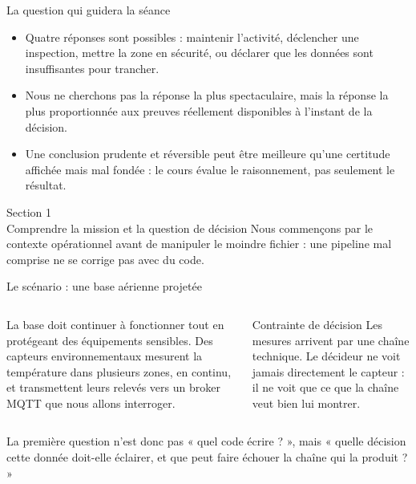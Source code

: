 \documentclass[aspectratio=169]{beamer}
\begin{document}
\begin{frame}{La question qui guidera la séance}
  \begin{itemize}
    \item Quatre réponses sont possibles : maintenir l'activité, déclencher une inspection, mettre la zone en sécurité, ou déclarer que les données sont insuffisantes pour trancher.
    \item Nous ne cherchons pas la réponse la plus spectaculaire, mais la réponse la plus proportionnée aux preuves réellement disponibles à l'instant de la décision.
    \item Une conclusion prudente et réversible peut être meilleure qu'une certitude affichée mais mal fondée : le cours évalue le raisonnement, pas seulement le résultat.
  \end{itemize}
\end{frame}

\begin{frame}[plain]
  \centering
  \Huge Section 1\\[3mm]
  \Large Comprendre la mission et la question de décision
  \vfill
  \normalsize Nous commençons par le contexte opérationnel avant de manipuler le moindre fichier : une pipeline mal comprise ne se corrige pas avec du code.
\end{frame}

\begin{frame}{Le scénario : une base aérienne projetée}
  \begin{columns}[T]
    La base doit continuer à fonctionner tout en protégeant des équipements sensibles. Des capteurs environnementaux mesurent la température dans plusieurs zones, en continu, et transmettent leurs relevés vers un broker MQTT que nous allons interroger.
    \begin{block}{Contrainte de décision}
      Les mesures arrivent par une chaîne technique. Le décideur ne voit jamais directement le capteur : il ne voit que ce que la chaîne veut bien lui montrer.
    \end{block}
  \end{columns}
  \vfill
  \alert{La première question n'est donc pas « quel code écrire ? », mais « quelle décision cette donnée doit-elle éclairer, et que peut faire échouer la chaîne qui la produit ? »}
\end{frame}
\end{document}

